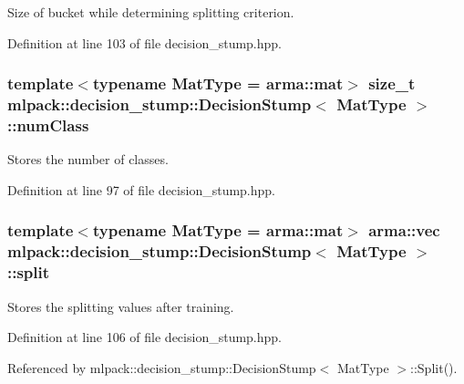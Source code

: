 Size of bucket while determining splitting criterion. 



Definition at line 103 of file decision\-\_\-stump.\-hpp.

\subsubsection[{num\-Class}]{\setlength{\rightskip}{0pt plus 5cm}template$<$typename Mat\-Type = arma\-::mat$>$ size\-\_\-t {\bf mlpack\-::decision\-\_\-stump\-::\-Decision\-Stump}$<$ Mat\-Type $>$\-::num\-Class\hspace{0.3cm}{\ttfamily [private]}}\label{classmlpack_1_1decision__stump_1_1DecisionStump_a577d50afe58f8ff48d3e5b0fea65f1f9}


Stores the number of classes. 



Definition at line 97 of file decision\-\_\-stump.\-hpp.

\subsubsection[{split}]{\setlength{\rightskip}{0pt plus 5cm}template$<$typename Mat\-Type = arma\-::mat$>$ arma\-::vec {\bf mlpack\-::decision\-\_\-stump\-::\-Decision\-Stump}$<$ Mat\-Type $>$\-::split\hspace{0.3cm}{\ttfamily [private]}}\label{classmlpack_1_1decision__stump_1_1DecisionStump_a2b06f53397b241918f0e23a2a7c3bbce}


Stores the splitting values after training. 



Definition at line 106 of file decision\-\_\-stump.\-hpp.



Referenced by mlpack\-::decision\-\_\-stump\-::\-Decision\-Stump$<$ Mat\-Type $>$\-::\-Split().

